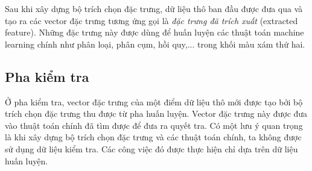 Sau khi xây dựng bộ trích chọn đặc trưng, dữ liệu thô ban đầu được đưa qua và
tạo ra các vector đặc trưng tương ứng gọi là \textit{đặc trưng đã trích
xuất} ({extracted feature}). Những đặc trưng này được dùng để huấn luyện
các thuật toán machine learning chính như phân loại, phân cụm, hồi quy,... trong
khối màu xám thứ hai.



 
 
\subsection{Pha kiểm tra}

Ở pha kiểm tra, vector đặc trưng của một điểm dữ liệu thô mới được tạo bởi bộ trích chọn đặc trưng thu được từ pha huấn luyện. Vector đặc trưng này được đưa
vào thuật toán chính đã tìm được để đưa ra quyết tra. Có một lưu ý quan trọng là khi xây dựng bộ trích chọn đặc trưng và các thuật toán chính, ta không được sử dụng dữ liệu kiểm tra. Các công việc đó được thực hiện chỉ dựa trên dữ liệu huấn luyện. 

